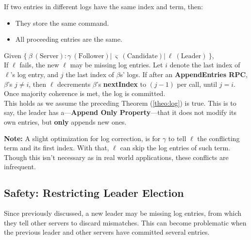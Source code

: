 \begin{theo}

    \label{theo:log}
    If two entries in different logs have the same index and term, then:
    \begin{itemize}
        \item They store the same command.
        \item All proceeding entries are the same.
    \end{itemize}
\end{theo}

\begin{Def}

    Given $\{\ \beta\ (\text{Server}): \gamma\ (\text{Follower})  |\ \varsigma\ (\text{Candidate}) |\ \ell\ (\text{Leader})\ \}$,\\

    \noindent
    If $\ell$ fails, the new $\ell$ may be missing log entries. Let $i$ denote the last index of $\ell$'s log entry, and $j$ the last index of $\beta$s' logs.
    If after an \textbf{AppendEntries RPC}, $\beta$'s $j\neq i$, then $\ell$ decrements $\beta$'s \textbf{nextIndex} to $(j-1)$ per call, until $j=i$.
    Once majority coherence is met, the log is committed.\\

    \noindent
    This holds as we assume the preceding Theorem (\ref{theo:log}) is true. This is to say, the leader has a---\textbf{Append Only Property}---that it does not modify its own entries, but \textbf{only} appends new ones.
\end{Def}

\vspace{-.5em}
\begin{Note} 

    \textbf{Note:} A slight optimization for log correction, is for $\gamma$ to tell $\ell$ the conflicting term and its first index.
    With that, $\ell$ can skip the log entries of such term. Though this isn't necessary as in real world applications, these conflicts are 
    infrequent.
\end{Note}

\noindent


\newpage 

\subsection{Safety: Restricting Leader Election}
\noindent
Since previously discussed, a new leader may be missing log entries, from which they tell other servers to discard mismatches. 
This can become problematic when the previous leader and other servers have committed several entries.\\

